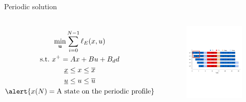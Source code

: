 \documentclass[table]{beamer}
\newcommand\bu {\mathbf{u}}
\begin{document}
\begin{frame}{Periodic solution}
\begin{columns}[T]
{\tiny{
 \begin{gather*}
\min_{\bu} \sum_{i=0}^{N-1} \ell_E(x,u) \\
\text{s.t.~} x^+ = Ax + Bu + B_dd \\
\underline{x} \leq x \leq \overline{x} \\
\underline{u} \leq u \leq \overline{u} \\
\alert{x(N) = \text{A state on the periodic profile}}
\end{gather*}}}
\begin{figure}
   \includegraphics[scale=0.30]{gantt_24.pdf}
  \end{figure}
\end{columns}
\centerline{\color{blue}{Observe that batch size at $t=1$ is 8.5 tons}}
\end{frame}
\end{document}
